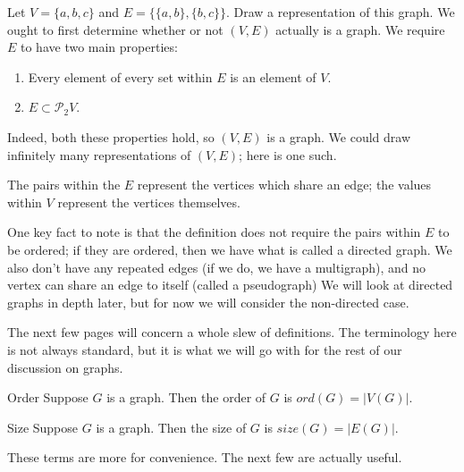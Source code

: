 \begin{example}{Let $V=\{a,b,c\}$ and $E=\{\{a,b\},\{b,c\}\}$. Draw a representation of this graph.}
    We ought to first determine whether or not $(V,E)$ actually is a graph.
    We require $E$ to have two main properties:

    \begin{enumerate}
        \item Every element of every set within $E$ is an element of $V$.
        \item $E\subset\mathcal{P}_{2}{V}$.
    \end{enumerate}

    Indeed, both these properties hold, so $(V,E)$ is a graph.
    We could draw infinitely many representations of $(V,E)$; here is one such.
    \begin{center}
    \end{center}
    The pairs within the $E$ represent the vertices which share an edge; the values within $V$ represent the vertices themselves.
\end{example}

One key fact to note is that the definition does not require the pairs within $E$ to be ordered; if they are ordered, then we have what is called a directed graph.
We also don't have any repeated edges (if we do, we have a multigraph), and no vertex can share an edge to itself (called a pseudograph)
We will look at directed graphs in depth later, but for now we will consider the non-directed case.

The next few pages will concern a whole slew of definitions.
The terminology here is not always standard, but it is what we will go with for the rest of our discussion on graphs.

\begin{definition}{Order}
    Suppose $G$ is a graph. Then the order of $G$ is $ord(G)=|V(G)|$.
\end{definition}
\begin{definition}{Size}
    Suppose $G$ is a graph. Then the size of $G$ is $size(G)=|E(G)|$.
\end{definition}

These terms are more for convenience. The next few are actually useful.

